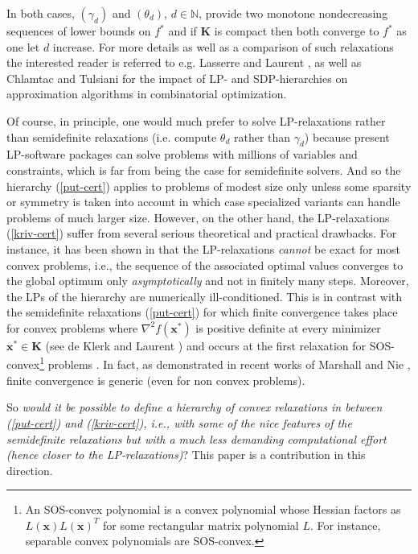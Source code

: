 \documentclass[11pt]{article}
\numberwithin{equation}{section}
\def\x{\mathbf{x}}
\def\N{\mathbb{N}}
\def\K{\mathbf{K}}
\begin{document}
In both cases, $(\gamma_d)$ and $(\theta_d)$, $d\in\N$, provide two monotone nondecreasing sequences of lower bounds 
on $f^*$ and if $\K$ is compact then both converge to $f^*$ as one let $d$ increase.
For more details as well as a comparison of such relaxations 
the interested reader is referred to e.g. 
Lasserre \cite{lasserre-imperial,Lasserre02a} and Laurent \cite{Laurent05}, as well as Chlamtac and Tulsiani \cite{tulsiani} 
for the impact of LP- and SDP-hierarchies on approximation algorithms in combinatorial optimization.

Of course, in principle,  one would much prefer to solve LP-relaxations rather than semidefinite relaxations (i.e. compute
$\theta_d$ rather than $\gamma_d$) because present
LP-software packages can solve problems with millions of variables and constraints, which is 
far from being the case for semidefinite solvers. And so the hierarchy (\ref{put-cert}) applies to problems of modest size only 
unless some sparsity or symmetry is taken into account in which case specialized variants can handle problems of much larger size.
However, on the other hand, the LP-relaxations (\ref{kriv-cert}) suffer from several serious 
theoretical and practical drawbacks. For instance, it has been shown in \cite{Lasserre02a,lasserre-imperial} that the LP-relaxations 
{\it cannot} be exact for most convex problems, i.e.,  the sequence of the associated optimal values converges
to the global optimum only {\it asymptotically} and not in finitely many steps. Moreover, the LPs of the hierarchy are numerically ill-conditioned.
This is in contrast with the semidefinite relaxations (\ref{put-cert})
for which finite convergence takes place for convex problems where $\nabla^2f(\x^*)$ is positive definite at every minimizer $\x^*\in\K$ 
(see de Klerk and Laurent \cite[Corollary 3.3]{deklerk-convex}) and occurs at the first relaxation for SOS-convex\footnote{An SOS-convex polynomial is a convex polynomial whose Hessian factors as $L(\x)L(\x)^T$ for some rectangular matrix polynomial $L$.
For instance, separable convex polynomials are SOS-convex.} problems \cite[Theorem 3.3]{lasserre-convex}.
In fact, as demonstrated in recent  works of Marshall \cite{Marshall2} and Nie \cite{nie2012},
finite convergence is generic (even for non convex problems).

So {\em would it be possible to define a hierarchy of convex relaxations in between (\ref{put-cert}) and (\ref{kriv-cert}), i.e.,
with some of the nice features of the semidefinite relaxations but with a much less demanding computational effort
(hence closer to the LP-relaxations)}? 
This paper is a contribution in this direction.\\
\end{document}
